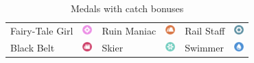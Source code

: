 \begin{table}[t]
\begin{tabular}{lc|lc|lc}
  Fairy-Tale Girl &\includegraphics[width=1em,keepaspectratio]{images/fairy.png} &
   Ruin Maniac &\includegraphics[width=1em,keepaspectratio]{images/ground.png} &
   Rail Staff &\includegraphics[width=1em,keepaspectratio]{images/steel.png} \\
  Black Belt & \includegraphics[width=1em,keepaspectratio]{images/fighting.png} &
   Skier & \includegraphics[width=1em,keepaspectratio]{images/ice.png} &
   Swimmer &\includegraphics[width=1em,keepaspectratio]{images/water.png}\\
\end{tabular}
  \caption{Medals with catch bonuses\label{table:medalcatch}}
\end{table}
\clearpage
\begingroup
\setlength{\tabcolsep}{1pt}
\footnotesize
